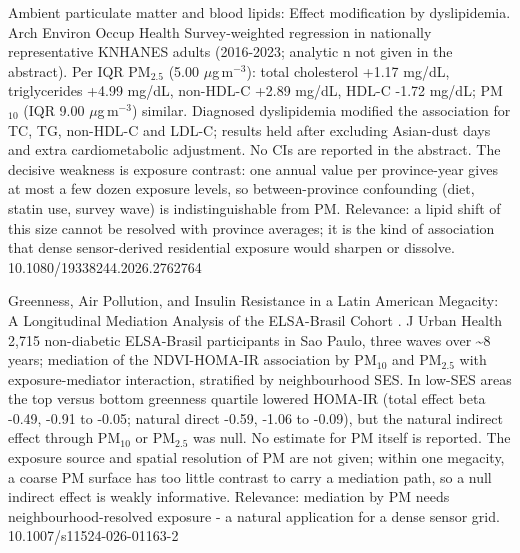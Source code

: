 \documentclass[10pt]{article}
\begin{document}
{Ambient particulate matter and blood lipids: Effect modification by dyslipidemia.}
{Arch Environ Occup Health}
{Survey-weighted regression in nationally representative KNHANES adults (2016-2023; analytic n not given in the abstract). Per IQR PM$_{2.5}$ (5.00 $\mu$g\,m$^{-3}$): total cholesterol +1.17 mg/dL, triglycerides +4.99 mg/dL, non-HDL-C +2.89 mg/dL, HDL-C -1.72 mg/dL; PM$_{10}$ (IQR 9.00 $\mu$g\,m$^{-3}$) similar. Diagnosed dyslipidemia modified the association for TC, TG, non-HDL-C and LDL-C; results held after excluding Asian-dust days and extra cardiometabolic adjustment. No CIs are reported in the abstract. The decisive weakness is exposure contrast: one annual value per province-year gives at most a few dozen exposure levels, so between-province confounding (diet, statin use, survey wave) is indistinguishable from PM. Relevance: a lipid shift of this size cannot be resolved with province averages; it is the kind of association that dense sensor-derived residential exposure would sharpen or dissolve.}
{10.1080/19338244.2026.2762764}

{Greenness, Air Pollution, and Insulin Resistance in a Latin American Megacity: A Longitudinal Mediation Analysis of the ELSA-Brasil Cohort .}
{J Urban Health}
{2,715 non-diabetic ELSA-Brasil participants in Sao Paulo, three waves over \textasciitilde{}8 years; mediation of the NDVI-HOMA-IR association by PM$_{10}$ and PM$_{2.5}$ with exposure-mediator interaction, stratified by neighbourhood SES. In low-SES areas the top versus bottom greenness quartile lowered HOMA-IR (total effect beta -0.49, -0.91 to -0.05; natural direct -0.59, -1.06 to -0.09), but the natural indirect effect through PM$_{10}$ or PM$_{2.5}$ was null. No estimate for PM itself is reported. The exposure source and spatial resolution of PM are not given; within one megacity, a coarse PM surface has too little contrast to carry a mediation path, so a null indirect effect is weakly informative. Relevance: mediation by PM needs neighbourhood-resolved exposure - a natural application for a dense sensor grid.}
{10.1007/s11524-026-01163-2}

\par{}\baselineskip{}\baselineskip
{}
\end{document}
